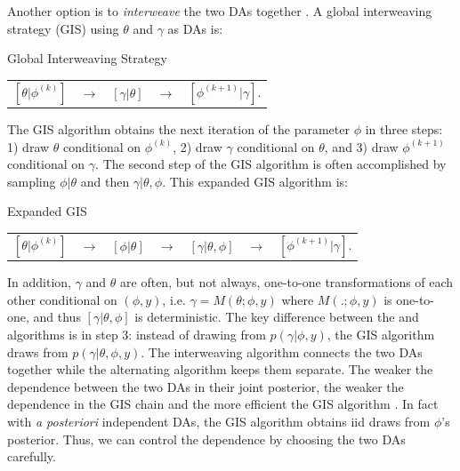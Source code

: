 \documentclass[12pt]{article}
\begin{document}
Another option is to {\it interweave} the two DAs together \citep{yu2011center}. A global interweaving strategy (GIS) using $\theta$ and $\gamma$ as DAs is:
\begin{alg*}[GIS]Global Interweaving Strategy\label{alg:GIS}
{\small \vspace{-.5cm}
\begin{center}
\begin{tabular}{lllll}
    $[\theta|\phi^{(k)}]$ & $\to$& $[\gamma|\theta]$& $\to$& $[\phi^{(k+1)}|\gamma]$.
\end{tabular}
\end{center}
}
\end{alg*}
\noindent The GIS algorithm obtains the next iteration of the parameter $\phi$ in three steps: 1) draw $\theta$ conditional on $\phi^{(k)}$, 2) draw $\gamma$ conditional on $\theta$, and 3) draw $\phi^{(k+1)}$ conditional on $\gamma$. %
The second step of the GIS algorithm is often accomplished by sampling $\phi|\theta$ and then $\gamma|\theta,\phi$. This expanded GIS algorithm is:
\begin{alg*}[eGIS]Expanded GIS\label{alg:eGIS}
{\small \vspace{-.5cm}
  \begin{center}
    \begin{tabular}{lllllll}
      $[\theta|\phi^{(k)}]$& $\to$& $[\phi|\theta]$& $\to $&$[\gamma|\theta,\phi]$& $\to$& $[\phi^{(k+1)}|\gamma]$.
    \end{tabular}
  \end{center}
}
\end{alg*}
\noindent
In addition, $\gamma$ and $\theta$ are often, but not always, one-to-one transformations of each other conditional on $(\phi,y)$, i.e. $\gamma = M(\theta;\phi,y)$ where $M(.;\phi,y)$ is one-to-one, and thus $[\gamma|\theta,\phi]$ is deterministic. The key difference between the  and  algorithms is in step 3: instead of drawing from $p(\gamma|\phi,y)$, the GIS algorithm draws from $p(\gamma|\theta,\phi,y)$. The interweaving algorithm connects the two DAs together while the alternating algorithm keeps them separate. The weaker the dependence between the two DAs in their joint posterior, the weaker the dependence in the GIS chain and the more efficient the GIS algorithm \citep{yu2011center}. In fact with \emph{a posteriori} independent DAs, the GIS algorithm obtains iid draws from $\phi$'s posterior. Thus, we can control the dependence by choosing the two DAs carefully. 
\end{document}
